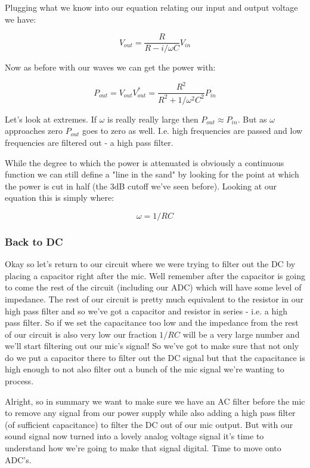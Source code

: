 \documentclass[12pt,a6paper]{book}
\begin{document}
Plugging what we know into our equation relating our input and output voltage we have:

\begin{equation}
V_{out}=\frac{R}{R - i/\omega C }V_{in}
\end{equation}

Now as before with our waves we can get the power with:

\begin{equation}
P_{out}=V_{out}V_{out}^*=\frac{R^2}{R^2+1/\omega^2 C^2}P_{in}
\end{equation}

Let's look at extremes. If $\omega$ is really really large then $P_{out}\approx P_{in}$. But as $\omega$ approaches zero $P_{out}$ goes to zero as well. I.e. high frequencies are passed and low frequencies are filtered out - a high pass filter. 

While the degree to which the power is attenuated is obviously a continuous function we can still define a "line in the sand" by looking for the point at which the power is cut in half (the 3dB cutoff we've seen before). Looking at our equation this is simply where:

\begin{equation}
\omega=1/RC
\end{equation}

\subsubsection{Back to DC}

Okay so let's return to our circuit where we were trying to filter out the DC by placing a capacitor right after the mic. Well remember after the capacitor is going to come the rest of the circuit (including our ADC) which will have some level of impedance. The rest of our circuit is pretty much equivalent to the resistor in our high pass filter and so we've got a capacitor and resistor in series - i.e. a high pass filter. So if we set the capacitance too low and the impedance from the rest of our circuit is also very low our fraction $1/RC$ will be a very large number and we'll start filtering out our mic's signal! So we've got to make sure that not only do we put a capacitor there to filter out the DC signal but that the capacitance is high enough to not also filter out a bunch of the mic signal we're wanting to process. 


Alright, so in summary we want to make sure we have an AC filter before the mic to remove any signal from our power supply while also adding a high pass filter (of sufficient capacitance) to filter the DC out of our mic output. But with our sound signal now turned into a lovely analog voltage signal it's time to understand how we're going to make that signal digital. Time to move onto ADC's.
\end{document}
